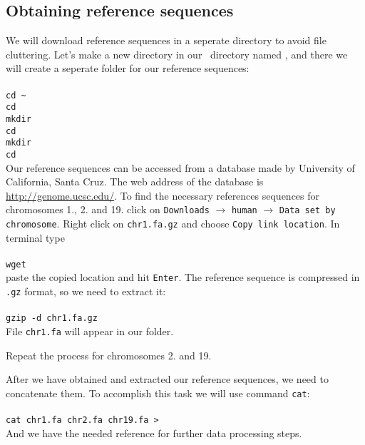 \subsection{Obtaining reference sequences}
We will download reference sequences in a seperate directory to avoid file cluttering. Let's make
a new directory in our \texttt{\workDir}~directory named \texttt{\reseqDir}, and there we will create
a seperate folder \texttt{} for our reference sequences:\\~\\
\texttt{cd \textasciitilde}\\
\texttt{cd \workDir}\\
\texttt{mkdir \reseqDir}\\
\texttt{cd \reseqDir}\\
\texttt{mkdir }\\
\texttt{cd }\\

Our reference sequences can be accessed from a database made by
University of California, Santa Cruz.
The web address of the database is \url{http://genome.ucsc.edu/}.
To find the necessary references sequences for chromosomes 1., 2. and 19.
click on \texttt{Downloads} $\rightarrow$ \texttt{human} $\rightarrow$
\texttt{Data set by chromosome}. Right click on \texttt{chr1.fa.gz}
and choose \texttt{Copy link location}. In terminal type\\~\\
\texttt{wget} \\

paste the copied location and hit \texttt{Enter}. The reference sequence is compressed in \texttt{.gz}
format, so we need to extract it:\\~\\
\texttt{gzip -d chr1.fa.gz}\\

File \texttt{chr1.fa} will appear in our folder.

Repeat the process for chromosomes 2. and 19.

After we have obtained and extracted our reference sequences, we need to concatenate them.
To accomplish this task we will use command \texttt{cat}:\\~\\
\texttt{cat chr1.fa chr2.fa chr19.fa > }\\

And we have the needed reference for further data processing steps.


